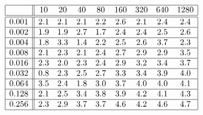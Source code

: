 \[
\begin{array}{|c||cccccccc|}
\hline 
& 10 & 20 & 40 & 80 & 160 & 320 & 640 & 1280\\
\hline \hline 
0.001 & 2.1 & 2.1 & 2.1 & 2.2 & 2.6 & 2.1 & 2.4 & 2.4 \\ \hline 
0.002 & 1.9 & 1.9 & 2.7 & 1.7 & 2.4 & 2.4 & 2.5 & 2.6 \\ \hline 
0.004 & 1.8 & 3.3 & 1.4 & 2.2 & 2.5 & 2.6 & 3.7 & 2.3 \\ \hline 
0.008 & 2.1 & 2.3 & 2.1 & 2.4 & 2.7 & 2.9 & 2.9 & 3.5 \\ \hline 
0.016 & 2.3 & 2.0 & 2.3 & 2.4 & 2.9 & 3.2 & 3.4 & 3.7 \\ \hline 
0.032 & 0.8 & 2.3 & 2.5 & 2.7 & 3.3 & 3.4 & 3.9 & 4.0 \\ \hline 
0.064 & 3.5 & 2.4 & 1.8 & 3.0 & 3.7 & 4.0 & 4.0 & 4.1 \\ \hline 
0.128 & 2.1 & 2.5 & 3.4 & 3.8 & 3.9 & 4.2 & 4.1 & 4.3 \\ \hline 
0.256 & 2.3 & 2.9 & 3.7 & 3.7 & 4.6 & 4.2 & 4.6 & 4.7 \\ \hline 
\end{array}
\]

